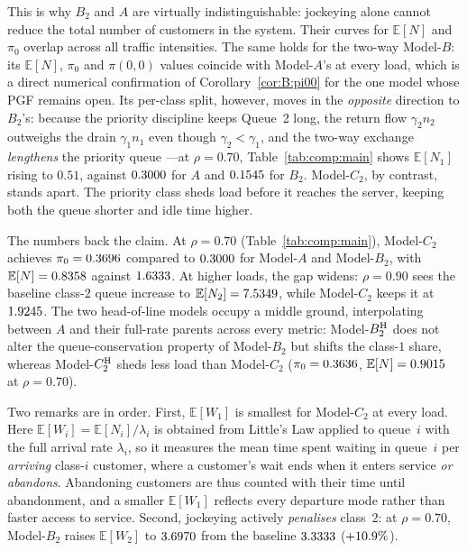This is why $B_2$ and $A$ are virtually indistinguishable: jockeying alone cannot reduce the total number of customers in the system. Their curves for $\mathbb{E}[N]$ and $\pi_0$ overlap across all traffic intensities. The same holds for the two-way Model-$B$: its $\mathbb{E}[N]$, $\pi_0$ and $\pi(0,0)$ values coincide with Model-$A$'s at every load, which is a direct numerical confirmation of Corollary~\ref{cor:B:pi00} for the one model whose PGF remains open. Its per-class split, however, moves in the \emph{opposite} direction to $B_2$'s: because the priority discipline keeps Queue~2 long, the return flow $\gamma_2 n_2$ outweighs the drain $\gamma_1 n_1$ even though $\gamma_2<\gamma_1$, and the two-way exchange \emph{lengthens} the priority queue ---at $\rho=0.70$, Table~\ref{tab:comp:main} shows $\mathbb{E}[N_1]$ rising to $0.51$, against $0.3000$ for $A$ and $0.1545$ for $B_2$. Model-$C_2$, by contrast, stands apart. The priority class sheds load before it reaches the server, keeping both the queue shorter and idle time higher.

The numbers back the claim. At $\rho=0.70$ (Table~\ref{tab:comp:main}), Model-$C_2$ achieves $\pi_0=0.3696$ compared to $0.3000$ for Model-$A$ and Model-$B_2$, with $\mathbb{E}[N]=0.8358$ against $1.6333$. At higher loads, the gap widens: $\rho=0.90$ sees the baseline class-2 queue increase to $\mathbb{E}[N_2]=7.5349$, while Model-$C_2$ keeps it at $1.9245$. The two head-of-line models occupy a middle ground, interpolating between $A$ and their full-rate parents across every metric: Model-$B_2^{\mathrm{H}}$ does not alter the queue-conservation property of Model-$B_2$ but shifts the class-$1$ share, whereas Model-$C_2^{\mathrm{H}}$ sheds less load than Model-$C_2$ ($\pi_0=0.3636$, $\mathbb{E}[N]=0.9015$ at $\rho=0.70$).

Two remarks are in order. First, $\mathbb{E}[W_1]$ is smallest for Model-$C_2$ at every load. Here $\mathbb{E}[W_i]=\mathbb{E}[N_i]/\lambda_i$ is obtained from Little's Law applied to queue~$i$ with the full arrival rate $\lambda_i$, so it measures the mean time spent waiting in queue~$i$ per \emph{arriving} class-$i$ customer, where a customer's wait ends when it enters service \emph{or abandons}. Abandoning customers are thus counted with their time until abandonment, and a smaller $\mathbb{E}[W_1]$ reflects every departure mode rather than faster access to service. Second, jockeying actively \emph{penalises} class~2: at $\rho=0.70$, Model-$B_2$ raises $\mathbb{E}[W_2]$ to $3.6970$ from the baseline $3.3333$
($+10.9\%$).

